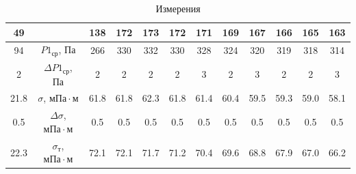 \begin{center}
\begin{table}[h!]
\begin{tabular}{|c||c||c|c|c|c|c|c|c|c|c|c|}
49                     &                               & 138                   & 172                   & 173                   & 172                   & 171                   & 169                   & 167                   & 166                   & 165                   & 163                   \\ \hline
\hline
94 & $P1_{ср}$, Па & 266 & 330 & 332 & 330 & 328 & 324 & 320 & 319 & 318 & 314 \\ \hline
2  & $\Delta P1_{ср}$, Па & 2   & 2   & 2   & 2   & 3   & 2   & 3   & 2   & 2   & 3   \\ \hline
21.8   & $\sigma$, $мПа \cdot м$         &  61.8   &   61.8  &   62.3  &  61.8   &   61.4    &  60.4   &   59.5    &   59.3  &   59.0  &   58.1    \\
\hline
0.5    & $\Delta\sigma$, $мПа \cdot м$ & 0.5 & 0.5 & 0.5 & 0.5 & 0.5 & 0.5 & 0.5 & 0.5 & 0.5 & 0.5 \\          
\hline
22.3   & $\sigma_т$, $мПа \cdot м$       &  72.1   &  72.1   &   71.7  &   71.2  &   70.4   &   69.6    &  68.8   &   67.9    &   67.0  &   66.2    \\   
\hline
\end{tabular}
\caption{Измерения}
\label{tab:my-table}
\end{table}
\end{center}

